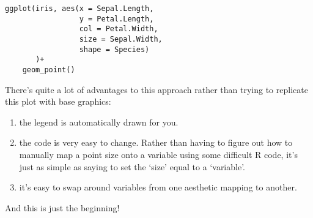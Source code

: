 \documentclass[11pt]{article}
\begin{document}
\begin{verbatim}
ggplot(iris, aes(x = Sepal.Length,
                 y = Petal.Length,
                 col = Petal.Width,
                 size = Sepal.Width,
                 shape = Species)
       )+
    geom_point()
\end{verbatim}


There's quite a lot of advantages to this approach rather than trying
to replicate this plot with base graphics:

\begin{enumerate}
\item the legend is automatically drawn for you.
\item the code is very easy to change. Rather than having to figure out
   how to manually map a point size onto a variable using some
   difficult R code, it's just as simple as saying to set the `size'
   equal to a `variable'.
\item it's easy to swap around variables from one aesthetic mapping to another.
\end{enumerate}

And this is just the beginning!
\end{document}
